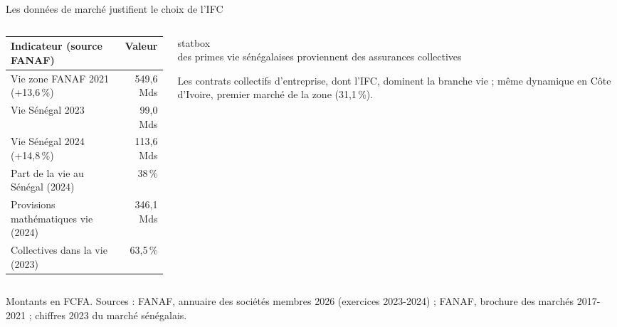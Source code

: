 \documentclass[aspectratio=169,11pt]{beamer}
\newcommand{\stat}[2]{%
  \begin{beamercolorbox}[wd=\linewidth,ht=1.5cm,dp=0.8cm,center,rounded=true]{statbox}%
    \centering{\LARGE\bfseries\textcolor{orangeC}{#1}}\\[0.15cm]
    {\small\textcolor{encre}{#2}}%
  \end{beamercolorbox}}
\begin{document}
\begin{frame}{Les données de marché justifient le choix de l'IFC}
  \vspace{0.2cm}
  \begin{columns}[T]
    \begin{column}{0.54\textwidth}
      \footnotesize
      \begin{tabular}{lr}
        \toprule
        \rowcolor{orangeM} Indicateur (source FANAF) & Valeur \\
        \midrule
        Vie zone FANAF 2021 (+13,6\,\%) & 549,6 Mds \\
        Vie Sénégal 2023 & 99,0 Mds \\
        Vie Sénégal 2024 (+14,8\,\%) & 113,6 Mds \\
        Part de la vie au Sénégal (2024) & 38\,\% \\
        Provisions mathématiques vie (2024) & 346,1 Mds \\
        Collectives dans la vie (2023) & 63,5\,\% \\
        \bottomrule
      \end{tabular}
    \end{column}
    \begin{column}{0.42\textwidth}
      \stat{63,5\,\%}{des primes vie sénégalaises proviennent des assurances
      collectives}
      \vspace{0.15cm}
      {\footnotesize Les contrats collectifs d'entreprise, dont l'IFC, dominent
      la branche vie ; même dynamique en Côte d'Ivoire, premier marché de la
      zone (31,1\,\%).}
    \end{column}
  \end{columns}
  {\tiny Montants en FCFA. Sources : FANAF, annuaire des sociétés membres 2026
  (exercices 2023-2024) ; FANAF, brochure des marchés 2017-2021 ; chiffres 2023
  du marché sénégalais.}
\end{frame}
\end{document}
